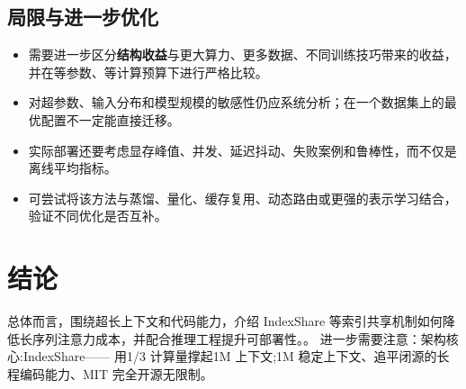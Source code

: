 \documentclass[UTF8,11pt,a4paper]{ctexart}
\newcommand{\term}[1]{\textbf{\textcolor{mainblue}{#1}}}
\begin{document}
\subsection{局限与进一步优化}
\begin{itemize}
\item 需要进一步区分\term{结构收益}与更大算力、更多数据、不同训练技巧带来的收益，并在等参数、等计算预算下进行严格比较。
\item 对超参数、输入分布和模型规模的敏感性仍应系统分析；在一个数据集上的最优配置不一定能直接迁移。
\item 实际部署还要考虑显存峰值、并发、延迟抖动、失败案例和鲁棒性，而不仅是离线平均指标。
\item 可尝试将该方法与蒸馏、量化、缓存复用、动态路由或更强的表示学习结合，验证不同优化是否互补。
\end{itemize}

\section{结论}
总体而言，围绕超长上下文和代码能力，介绍 IndexShare 等索引共享机制如何降低长序列注意力成本，并配合推理工程提升可部署性。。 进一步需要注意：架构核心:IndexShare—— 用1/3 计算量撑起1M 上下文;1M 稳定上下文、追平闭源的长程编码能力、MIT 完全开源无限制。
\end{document}
